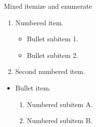 \documentclass[14pt,t]{beamer}
\begin{document}
\begin{frame}{Mixed itemize and enumerate}
\begin{enumerate}
\item Numbered item.
  \begin{itemize}
  \item Bullet subitem 1.
  \item Bullet subitem 2.
  \end{itemize}
\item Second numbered item.
\end{enumerate}

\begin{itemize}
\item Bullet item.
  \begin{enumerate}
  \item Numbered subitem A.
  \item Numbered subitem B.
  \end{enumerate}
\end{itemize}
\end{frame}
\end{document}
